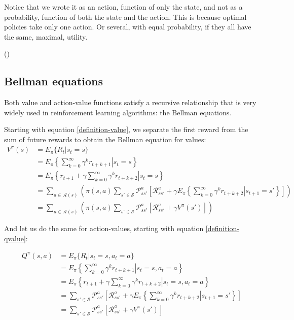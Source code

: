 Notice that we wrote it as an action, function of only the state, and not as a
probability, function of both the state and the action. This is because optimal
policies take only one action. Or several, with equal probability, if they all
have the same, maximal, utility.

(\cite[Subsection~17.1.2]{russell2009aima})

\subsection{Bellman equations}
Both value and action-value functions satisfy a recursive relationship that is
very widely used in reinforcement learning algorithms: the Bellman equations.

Starting with equation \ref{definition-value}, we separate the first reward
from the sum of future rewards to obtain the Bellman equation for values:
\begin{equation}
\begin{split}
  V^\pi(s) & = E_\pi \lbrace R_t | s_t = s \rbrace \\
  & = E_\pi \left\{ \left. \sum_{k=0}^\infty \gamma^kr_{t+k+1} \right| s_t = s \right\} \\
  & = E_\pi \left\{ \left. r_{t+1} + \gamma\sum_{k=0}^\infty \gamma^kr_{t+k+2} \right| s_t = s \right\} \\
  & = \sum_{a\in\mathcal{A}(s)} \left( \pi(s, a) \sum_{s' \in \mathcal{S}}\mathcal{P}^a_{ss'}
\left[\mathcal{R}^a_{ss'} + \gamma E_\pi \left\{ \left. \sum_{k=0}^\infty
\gamma^kr_{t+k+2} \right| s_{t+1} = s' \right\} \right] \right) \\
  & = \sum_{a\in\mathcal{A}(s)} \left( \pi(s, a) \sum_{s' \in \mathcal{S}}\mathcal{P}^a_{ss'}
\left[\mathcal{R}^a_{ss'} + \gamma V^\pi(s') \right] \right)
\end{split}
\end{equation}

And let us do the same for action-values, starting with equation
\ref{definition-qvalue}:

\begin{equation}
  \begin{split}
    Q^\pi(s, a) & = E_\pi \lbrace R_t | s_t = s, a_t = a \rbrace \\
    & = E_\pi \left\{ \left. \sum_{k=0}^\infty \gamma^kr_{t+k+1} \right| s_t = s, a_t = a \right\} \\
    & = E_\pi \left\{ \left. r_{t+1} + \gamma\sum_{k=0}^\infty \gamma^kr_{t+k+2} \right| s_t = s, a_t = a \right\} \\
    & = \sum_{s' \in \mathcal{S}}\mathcal{P}^a_{ss'} \left[\mathcal{R}^a_{ss'} +
      \gamma E_\pi \left\{ \left. \sum_{k=0}^\infty \gamma^kr_{t+k+2} \right| s_{t+1}
        = s' \right\} \right] \\
    & = \sum_{s' \in \mathcal{S}}\mathcal{P}^a_{ss'}
    \left[\mathcal{R}^a_{ss'} + \gamma V^\pi(s') \right]
  \end{split}
\end{equation}

